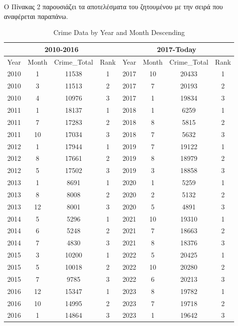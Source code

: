 \documentclass{article}
\begin{document}
Ο Πίνακας 2 παρουσιάζει τα αποτελέσματα του ζητουμένου με την σειρά που αναφέρεται παραπάνω. 
\begin{table}[h]
\centering
\begin{tabular}{|c|c|c|c||c|c|c|c|}
\hline
\multicolumn{4}{|c||}{2010-2016} & \multicolumn{4}{c|}{2017-Today} \\ \hline
Year & Month & Crime\_Total & Rank & Year & Month & Crime\_Total & Rank  \\ \hline
2010 & 1     & 11538       & 1    & 2017 & 10    & 20433       & 1    \\ \hline
2010 & 3     & 11513       & 2    & 2017 & 7     & 20193       & 2    \\ \hline
2010 & 4     & 10976       & 3    & 2017 & 1     & 19834       & 3    \\ \hline
2011 & 1     & 18137       & 1    & 2018 & 1     & 6259        & 1    \\ \hline
2011 & 7     & 17283       & 2    & 2018 & 8     & 5815        & 2    \\ \hline
2011 & 10    & 17034       & 3    & 2018 & 7     & 5632        & 3    \\ \hline
2012 & 1     & 17944       & 1    & 2019 & 7     & 19122       & 1    \\ \hline
2012 & 8     & 17661       & 2    & 2019 & 8     & 18979       & 2    \\ \hline
2012 & 5     & 17502       & 3    & 2019 & 3     & 18858       & 3    \\ \hline
2013 & 1     & 8691        & 1    & 2020 & 1     & 5259        & 1    \\ \hline
2013 & 8     & 8008        & 2    & 2020 & 2     & 5132        & 2    \\ \hline
2013 & 12    & 8001        & 3    & 2020 & 5     & 4891        & 3    \\ \hline
2014 & 5     & 5296        & 1    & 2021 & 10    & 19310       & 1    \\ \hline
2014 & 6     & 5248        & 2    & 2021 & 7     & 18663       & 2    \\ \hline
2014 & 7     & 4830        & 3    & 2021 & 8     & 18376       & 3    \\ \hline
2015 & 3     & 10200       & 1    & 2022 & 5     & 20425       & 1    \\ \hline
2015 & 5     & 10018       & 2    & 2022 & 10    & 20280       & 2    \\ \hline
2015 & 7     & 9785        & 3    & 2022 & 6     & 20213       & 3    \\ \hline
2016 & 12    & 15347       & 1    & 2023 & 8     & 19782       & 1    \\ \hline
2016 & 10    & 14995       & 2    & 2023 & 7     & 19718       & 2    \\ \hline
2016 & 1     & 14864       & 3    & 2023 & 1     & 19642       & 3    \\ \hline

\end{tabular}
\caption{Crime Data by Year and Month Descending}
\label{table:crime_data}
\end{table}
\\
\end{document}
